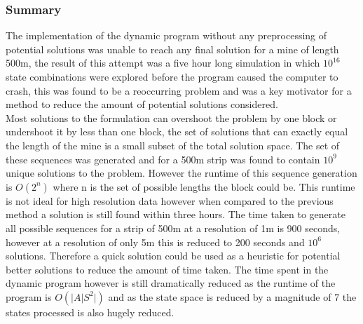 \subsubsection{Summary}
The implementation of the dynamic program without any preprocessing of potential solutions was unable to reach any final solution for a mine of length 500m, the result of this attempt was a five hour long simulation in which $10^{16}$ state combinations were explored before the program caused the computer to crash, this was found to be a reoccurring problem and was a key motivator for a method to reduce the amount of potential solutions considered. \\
Most solutions to the formulation can overshoot the problem by one block or undershoot it by less than one block, the set of solutions that can exactly equal the length of the mine is a small subset of the total solution space. The set of these sequences was generated and for a 500m strip was found to contain $10^9$ unique solutions to the problem. However the runtime of this sequence generation is $O(2^n)$ where n is the set of possible lengths the block could be. This runtime is not ideal for high resolution data however when compared to the previous method a solution is still found within three hours. The time taken to generate all possible sequences for a strip of 500m at a resolution of 1m is 900 seconds, however at a resolution of only 5m this is reduced to 200 seconds and $10^6$ solutions. Therefore a quick solution could be used as a heuristic for potential better solutions to reduce the amount of time taken. The time spent in the dynamic program however is still dramatically reduced as the runtime of the program is $O(|A|S^2|)$ and as the state space is reduced by a magnitude of 7 the states processed is also hugely reduced. 




